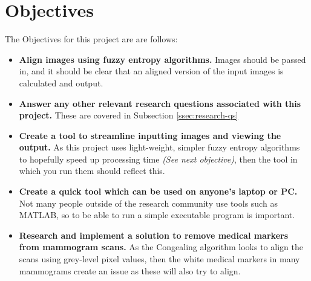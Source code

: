 \section{Objectives}
\label{sec:objectives}

The Objectives for this project are are follows:

\begin{itemize}
  \item \textbf{Align images using fuzzy entropy algorithms.} Images should be passed in, and it should be clear that an aligned version of the input images is calculated and output.
  \item \textbf{Answer any other relevant research questions associated with this project.} These are covered in Subsection \ref{ssec:research-qs}
  \item \textbf{Create a tool to streamline inputting images and viewing the output.} As this project uses light-weight, simpler fuzzy entropy algorithms to hopefully speed up processing time \textit{(See next objective)}, then the tool in which you run them should reflect this.
  \item \textbf{Create a quick tool which can be used on anyone's laptop or PC.} Not many people outside of the research community use tools such as MATLAB, so to be able to run a simple executable program is important.
  \item \textbf{Research and implement a solution to remove medical markers from mammogram scans.} As the \Gls{Congealing} algorithm looks to align the scans using grey-level pixel values, then the white medical markers in many mammograms create an issue as these will also try to align.
\end{itemize}
